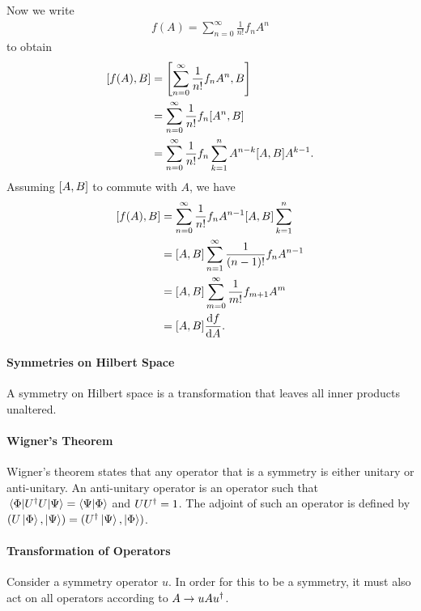 Now we write
\begin{align*}
	f(A) = \sum\limits_{n = 0}^{\infty}\frac{1}{n!}f_{n}A^{n}
\end{align*}
to obtain
\begin{align*}
	\comm{f(A)}{B} &= \comm{\sum\limits_{n = 0}^{\infty}\frac{1}{n!}f_{n}A^{n}}{B} \\
	               &= \sum\limits_{n = 0}^{\infty}\frac{1}{n!}f_{n}\comm{A^{n}}{B} \\
	               &= \sum\limits_{n = 0}^{\infty}\frac{1}{n!}f_{n}\sum\limits_{k = 1}^{n}A^{n - k}\comm{A}{B}A^{k - 1}.
\end{align*}
Assuming $\comm{A}{B}$ to commute with $A$, we have
\begin{align*}
	\comm{f(A)}{B} &= \sum\limits_{n = 0}^{\infty}\frac{1}{n!}f_{n}A^{n - 1}\comm{A}{B}\sum\limits_{k = 1}^{n} \\
	               &= \comm{A}{B}\sum\limits_{n = 1}^{\infty}\frac{1}{(n - 1)!}f_{n}A^{n - 1} \\
	               &= \comm{A}{B}\sum\limits_{m = 0}^{\infty}\frac{1}{m!}f_{m + 1}A^{m} \\
	               &= \comm{A}{B}\dv{f}{A}.
\end{align*}

\paragraph{Symmetries on Hilbert Space}
A symmetry on Hilbert space is a transformation that leaves all inner products unaltered.

\paragraph{Wigner's Theorem}
Wigner's theorem states that any operator that is a symmetry is either unitary or anti-unitary. An anti-unitary operator is an operator such that $\mel{\Phi}{U^{\dagger}U}{\Psi} = \braket{\Psi}{\Phi}$ and $UU^{\dagger} = 1$. The adjoint of such an operator is defined by $(U\ket{\Phi}, \ket{\Psi}) = (U^{\dagger}\ket{\Psi}, \ket{\Phi})$.

\paragraph{Transformation of Operators}
Consider a symmetry operator $u$. In order for this to be a symmetry, it must also act on all operators according to $A\to uAu^{\dagger}$.

